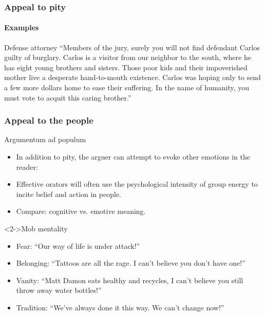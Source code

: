 \documentclass[10pt,letterpaper,xcolor=dvipsnames,handout]{beamer}
\begin{document}
\begin{frame}
  \frametitle{Appeal to pity}
  \framesubtitle{Examples}
  
  \begin{block}{Defense attorney}
  ``Members of the jury, surely you will not find defendant Carlos guilty of burglary.  Carlos is a visitor from our neighbor to the south, where he has eight young brothers and sisters.  Those poor kids and their impoverished mother live a desperate hand-to-mouth existence.  Carlos was hoping only to send a few more dollars home to ease their suffering.  In the name of humanity, you must vote to acquit this caring brother.''
  \end{block}
  
  
\end{frame}

\begin{frame}
  \frametitle{Appeal to the people}
  
  \begin{block}{Argumentum ad populum}
    \begin{itemize}
      \item In addition to pity, the arguer can attempt to evoke other emotions in the reader:
      \item Effective orators will often use the psychological intensity of group energy to incite belief and action in people.
      \item Compare: cognitive vs. emotive meaning.
    \end{itemize}
  \end{block}
  
  \begin{block}<2->{Mob mentality}
    \begin{itemize}
      \item Fear: ``Our way of life is under attack!''
      \item Belonging: ``Tattoos are all the rage.  I can't believe you don't have one!'' 
      \item Vanity: ``Matt Damon eats healthy and recycles,  I can't believe you still throw away water bottles!''
      \item Tradition: ``We've always done it this way.  We can't change now!''
    \end{itemize}
  \end{block}
  
\end{frame}
\end{document}
